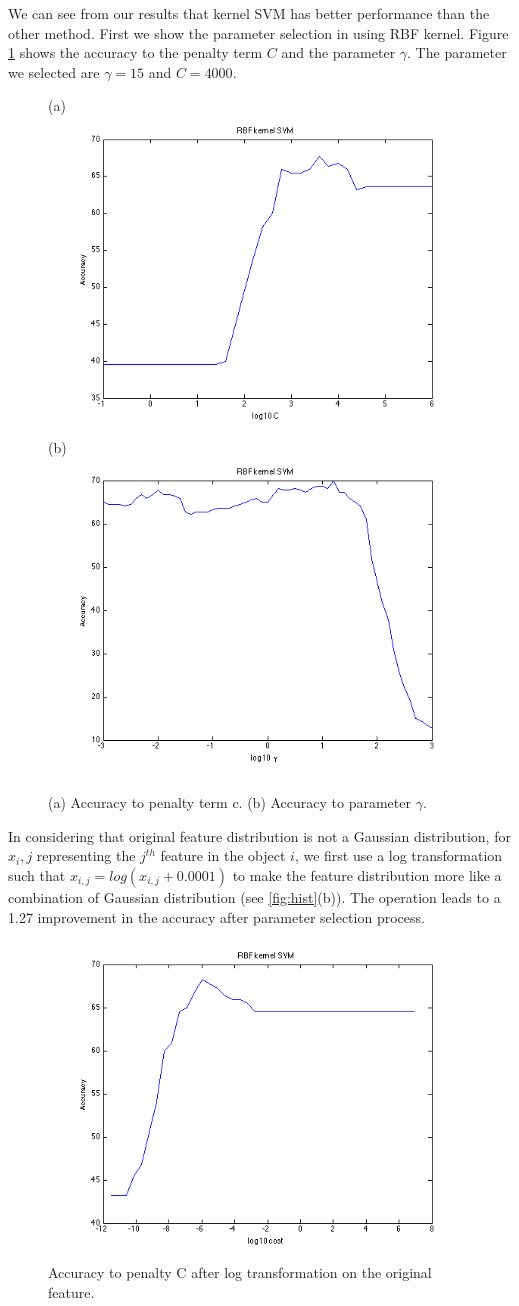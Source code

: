 \documentclass{article} %
\begin{document}
We can see from our results that kernel SVM has better performance than the other method. First we show the parameter selection in using RBF kernel. Figure \ref{fig:RBF} shows the accuracy to the penalty term $C$ and the parameter $\gamma$. The parameter we selected are $\gamma = 15$ and $C = 4000$.

\begin{figure}[ht!]
    \centering
    {(a)\includegraphics[width=0.38\linewidth]{../Figure/RBF_cost_accuracy}
    (b)\includegraphics[width=0.38\linewidth]{../Figure/RBF_gamma_accuracy}}
    \caption{(a) Accuracy to penalty term c. (b) Accuracy to parameter $\gamma$. }
    \label{fig:RBF}
\end{figure}

In considering that original feature distribution is not a Gaussian distribution, for $x_i,j$ representing the $j^{th}$ feature in the object $i$, we first use a log transformation such that $x_{i,j} = log(x_{i,j} + 0.0001)$ to make the feature distribution more like a combination of Gaussian distribution (see \ref{fig:hist}(b)). The operation leads to a 1.27 improvement in the accuracy after parameter selection process.


\begin{figure}[ht!]
    \centering
    \includegraphics[width=0.38\linewidth]{../Figure/RBF_cost_accuracy_log}
     \centering
    \caption{Accuracy to penalty C after log transformation on the original feature.}
\end{figure}
\end{document}
